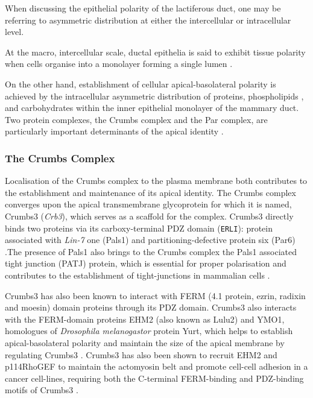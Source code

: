 When discussing the epithelial polarity of the lactiferous duct, one may be
referring to asymmetric distribution at either the intercellular or
intracellular level.\par

At the macro, intercellular scale, ductal epithelia is said to exhibit tissue
polarity when cells organise into a monolayer forming a single lumen \citep{bissell2003}.\par

On the other hand, establishment of cellular apical-basolateral polarity is
achieved by the intracellular asymmetric distribution of proteins, phospholipids
, and carbohydrates within the inner epithelial monolayer of the mammary duct.
Two protein complexes, the Crumbs complex and the Par complex, are particularly
important determinants of the apical identity \citep{horikoshi2009,whiteman2014}.\par

\subsubsection{The Crumbs Complex}
Localisation of the Crumbs complex to the plasma membrane both contributes to
the establishment and maintenance of its apical identity. The Crumbs complex
converges upon the apical transmembrane glycoprotein for which it is named,
Crumbs3 ({\it Crb3}), which serves as a scaffold for the complex. Crumbs3 directly
binds two proteins via its carboxy-terminal PDZ domain ({\tt ERLI}): protein
associated with {\it Lin-7} one (Pals1) and partitioning-defective protein six (Par6) \citep{lemmers2004, roh2002}.The presence of Pals1 also brings to the Crumbs complex the Pals1 associated tight junction (PATJ) protein, which is essential for proper polarisation and contributes to the establishment of tight-junctions in mammalian cells \citep{shin2005}.\par


Crumbs3 has also been known to interact with FERM (4.1 protein, ezrin,
radixin and moesin) domain proteins through its PDZ domain. Crumbs3 also
interacts with the FERM-domain proteins EHM2 (also known as Lulu2) and YMO1,
homologues of {\it Drosophila melanogastor} protein Yurt, which helps to establish
apical-basolateral polarity and maintain the size of the apical membrane by
regulating Crumbs3 \citep{laprise2006}. Crumbs3 has also
been shown to recruit EHM2 and p114RhoGEF to maintain the actomyosin belt and
promote cell-cell adhesion in a cancer cell-lines, requiring both the C-terminal
FERM-binding and PDZ-binding motifs of Crumbs3 \citep{loie2015}.\par

